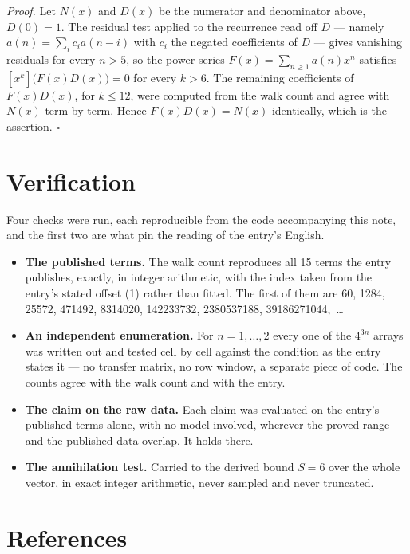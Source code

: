 \documentclass[11pt]{article}
\theoremstyle{definition}
\begin{document}
{\itshape Proof.} Let $N(x)$ and $D(x)$ be the numerator and denominator above, $D(0)=1$. The residual test applied to the recurrence read off $D$ --- namely $a(n) = \sum_i c_i a(n-i)$ with $c_i$ the negated coefficients of $D$ --- gives vanishing residuals for every $n > 5$, so the power series $F(x)=\sum_{n\ge 1}a(n)x^n$ satisfies $[x^k]\bigl(F(x)D(x)\bigr) = 0$ for every $k > 6$. The remaining coefficients of $F(x)D(x)$, for $k \le 12$, were computed from the walk count and agree with $N(x)$ term by term. Hence $F(x)D(x) = N(x)$ identically, which is the assertion. $\square$

\section{Verification}

Four checks were run, each reproducible from the code accompanying this note, and the first two are what pin the reading of the entry's English.

\begin{itemize}

\item {\bfseries The published terms.} The walk count reproduces all 15 terms the entry publishes, exactly, in integer arithmetic, with the index taken from the entry's stated offset (1) rather than fitted. The first of them are 60, 1284, 25572, 471492, 8314020, 142233732, 2380537188, 39186271044,~\dots

\item {\bfseries An independent enumeration.} For $n = 1,\dots,2$ every one of the $4^{3n}$ arrays was written out and tested cell by cell against the condition as the entry states it --- no transfer matrix, no row window, a separate piece of code. The counts agree with the walk count and with the entry.

\item {\bfseries The claim on the raw data.} Each claim was evaluated on the entry's published terms alone, with no model involved, wherever the proved range and the published data overlap. It holds there.

\item {\bfseries The annihilation test.} Carried to the derived bound $S = 6$ over the whole vector, in exact integer arithmetic, never sampled and never truncated.

\end{itemize}

\section{References}
\end{document}
